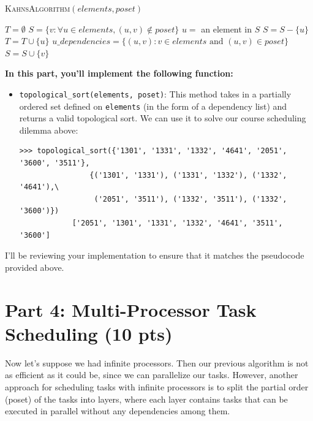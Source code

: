 \documentclass{article}
\begin{document}
    \begin{algorithm}
        \caption{\textsc{KahnsAlgorithm}$(elements, poset)$}\label{alg:cap}
        \label{alg:topological_sort}
        \begin{algorithmic}
            \State $T = \emptyset$
            \State $S = \{ v : \forall u \in elements, (u, v) \notin poset\}$\footnotemark
                \State $u = $ an element in $S$
                \State $S = S - \{u\}$
                \State $T = T \cup \{u\}$
                \State $u\_dependencies = \{(u, v) : v \in elements \text{ and }(u, v) \in poset\}$
                    $S = S \cup \{v\}$ \EndIf
                \EndFor
            \EndWhile
            \State {}
        \end{algorithmic}
    \end{algorithm}
    
    \begin{tcolorbox}[colback=yellow!30]
        \textbf{In this part, you'll implement the following function:}
        \begin{itemize}
            \item 
        \lstinline{topological_sort(elements, poset)}: This method takes in a partially ordered set defined on \lstinline{elements} (in the form of a dependency list) and returns a valid topological sort. We can use it to solve our course scheduling dilemma above:

    \begin{lstlisting}[belowskip=-10pt]
        >>> topological_sort({'1301', '1331', '1332', '4641', '2051', '3600', '3511'},
                {('1301', '1331'), ('1331', '1332'), ('1332', '4641'),\
                 ('2051', '3511'), ('1332', '3511'), ('1332', '3600')})
            ['2051', '1301', '1331', '1332', '4641', '3511', '3600']
    \end{lstlisting}
        \end{itemize}
    I'll be reviewing your implementation to ensure that it matches the pseudocode provided above.
    \end{tcolorbox}

\section*{Part 4: Multi-Processor Task Scheduling (10 pts)}
    Now let's suppose we had infinite processors. Then our previous algorithm is not as efficient as it could be, since we can parallelize our tasks. However, another approach for scheduling tasks with infinite processors is to split the partial order (poset) of the tasks into layers, where each layer contains tasks that can be executed in parallel without any dependencies among them.
\end{document}
